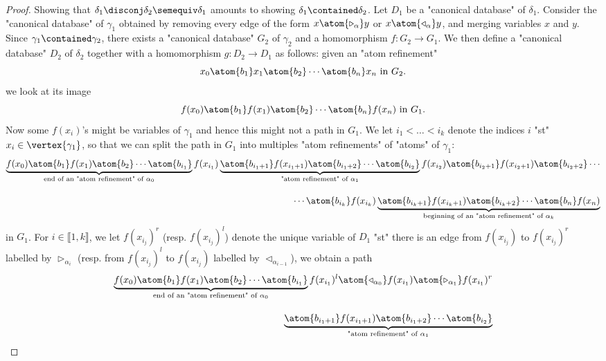 \begin{proof}
	Showing that $\delta_1 \disconj \delta_2 \semequiv \delta_1$
	amounts to showing $\delta_1 \contained \delta_2$.
	Let $D_1$ be a "canonical database" of $\delta_1$.
	Consider the "canonical database" of $\gamma_1$ obtained
	by removing every edge of the form $x \atom{\triangleright_\alpha} y$
	or $x \atom{\triangleleft_\alpha} y$, and merging variables $x$ and $y$.
	Since $\gamma_1 \contained \gamma_2$, there exists a "canonical database"
	$G_2$ of $\gamma_2$ and a homomorphism $f\colon G_2 \to G_1$.
	We then define a "canonical database" $D_2$ of $\delta_2$ together
	with a homomorphism $g\colon D_2 \to D_1$ as follows:
	given an "atom refinement"
	\[
		x_0 \atom{b_1} x_1 \atom{b_2} \cdots \atom{b_n} x_n
		\text{ in } G_2.
	\]
	we look at its image
	\[
		f(x_0) \atom{b_1} f(x_1) \atom{b_2} \cdots \atom{b_n} f(x_n)
		\text{ in } G_1.
	\]
	Now some $f(x_i)$'s might be variables of $\gamma_1$ and hence
	this might not a path in $G_1$.
	We let $i_1 < \hdots < i_k$ denote the indices $i$ "st" $x_i \in \vertex{\gamma_1}$, so
	that we can split the path in $G_1$ into multiples "atom refinements" 
	of "atoms" of $\gamma_1$:
	\begin{align*}
		\underbrace{f(x_0) \atom{b_1} f(x_1) \atom{b_2} \cdots \atom{b_{i_1}}}_{
			\text{end of an "atom refinement" of $\alpha_0$}
		}
		f(x_{i_1})
		\underbrace{\atom{b_{i_1+1}} f(x_{i_{1}+1}) \atom{b_{i_1+2}} \cdots \atom{b_{i_2}}}_{
			\text{"atom refinement" of $\alpha_1$}
		}
		f(x_{i_2})
		\atom{b_{i_2+1}} f(x_{i_{2}+1}) \atom{b_{i_2+2}} \cdots
		\\[1em]
		\cdots \atom{b_{i_k}}
		f(x_{i_k})
		\underbrace{\atom{b_{i_k+1}} f(x_{i_{k}+1}) \atom{b_{i_k+2}} \cdots \atom{b_n} f(x_n)}_{
			\text{beginning of an "atom refinement" of $\alpha_k$}
		}
	\end{align*}
	in $G_1$.
	For $i \in\lBrack 1,k\rBrack$, we let $f(x_{i_j})^r$ (resp. $f(x_{i_j})^l$) denote the unique variable of
	$D_1$ "st" there is an edge from $f(x_{i_j})$ to $f(x_{i_j})^r$
	labelled by $\triangleright_{\alpha_i}$ (resp. from $f(x_{i_j})^l$ to $f(x_{i_j})$
	labelled by $\triangleleft_{\alpha_{i-1}}$), we obtain a path
	\begin{align*}
		\underbrace{f(x_0) \atom{b_1} f(x_1) \atom{b_2} \cdots \atom{b_{i_1}}}_{
			\text{end of an "atom refinement" of $\alpha_0$}
		}
		f(x_{i_1})^l \atom{\triangleleft_{\alpha_{0}}} f(x_{i_1}) \atom{\triangleright_{\alpha_{1}}} f(x_{i_1})^r
		\\[1em]
		\underbrace{\atom{b_{i_1+1}} f(x_{i_{1}+1}) \atom{b_{i_1+2}} \cdots \atom{b_{i_2}}}_{
			\text{"atom refinement" of $\alpha_1$}
}
\end{align*}
\end{proof}

